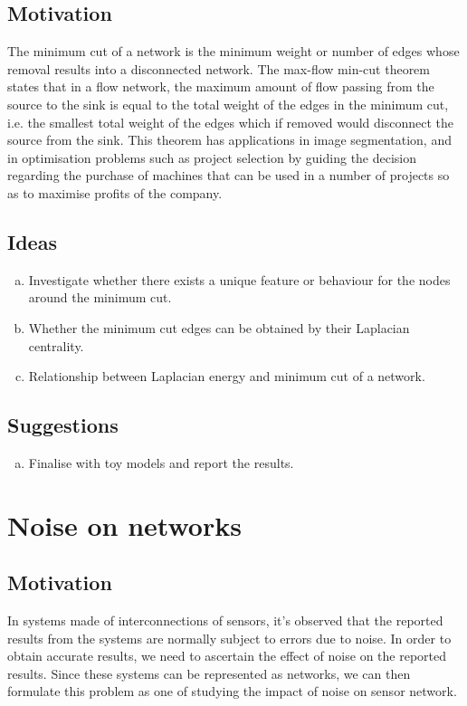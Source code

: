 \documentclass[10pt,a4paper]{article}
\begin{document}
	\subsection{Motivation}
	The minimum cut of a network is the minimum weight or number of edges whose removal results into a disconnected network. The max-flow min-cut theorem states that in a flow network, the maximum amount of flow passing from the source to the sink is equal to the total weight of the edges in the minimum cut, i.e. the smallest total weight of the edges which if removed would disconnect the source from the sink. This theorem has applications in image segmentation, and in optimisation problems such as project selection by guiding the decision regarding the purchase of machines that can be used in a number of projects so as to maximise profits of the company.
	\subsection{Ideas}
	\begin{enumerate}[a)]
	\item Investigate whether there exists a unique feature or behaviour for the nodes around the minimum cut.
	\item Whether the minimum cut edges can be obtained by their Laplacian centrality.
	\item  Relationship between Laplacian energy and minimum cut of a network.
	\end{enumerate}

    \subsection{Suggestions}
    \begin{enumerate}[a)]
    	\item  Finalise with toy models and report the results.
    \end{enumerate}


	\section{Noise on networks}
	\subsection{Motivation}
	In systems made of interconnections of sensors, it's observed that the reported results from  the systems are normally subject to errors due to noise. In order to obtain accurate results, we need to ascertain the effect of noise on the reported results. Since these systems can be represented as networks, we can then formulate this problem as one of studying the impact of noise on sensor network. 
	
\end{document}
